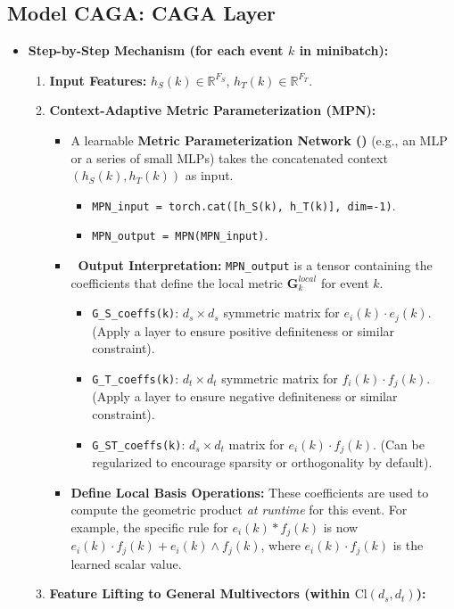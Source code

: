 \documentclass[11pt]{article}
\newcommand{\Cl}[2]{\text{Cl}(#1, #2)} %
\newcommand{\R}{\mathbb{R}}
\newcommand{\Fs}{F_S} %
\newcommand{\Ft}{F_T} %
\newcommand{\Hs}{h_S} %
\newcommand{\Ht}{h_T} %
\newcommand{\MPN}{\text{MPN}}
\newenvironment{modeldescription}[1]{%
    \subsection*{Model #1: \MakeUppercase{#1} Layer}%
    \begin{itemize}[leftmargin=*,noitemsep]%
}{%
    \end{itemize}%
}
\begin{document}
\begin{modeldescription}{CAGA}
    \item \textbf{Step-by-Step Mechanism (for each event $k$ in minibatch):}
    \begin{enumerate}[noitemsep]
        \item \textbf{Input Features:} $\Hs(k) \in \R^{\Fs}$, $\Ht(k) \in \R^{\Ft}$.
        \item \textbf{Context-Adaptive Metric Parameterization (MPN):}
        \begin{itemize}[noitemsep]
            \item A learnable \textbf{Metric Parameterization Network (\MPN)} (e.g., an MLP or a series of small MLPs) takes the concatenated context $(\Hs(k), \Ht(k))$ as input.
                \begin{itemize}[noitemsep]
                    \item \texttt{MPN\_input = torch.cat([\Hs(k), \Ht(k)], dim=-1)}.
                    \item \texttt{MPN\_output = MPN(MPN\_input)}.
                \end{itemize}
            \item \textbf{\MPN \ Output Interpretation:} \texttt{MPN\_output} is a tensor containing the coefficients that define the local metric $\mathbf{G}_k^{local}$ for event $k$.
                \begin{itemize}[noitemsep]
                    \item \texttt{G\_S\_coeffs(k)}: $d_s \times d_s$ symmetric matrix for $e_i(k) \cdot e_j(k)$. (Apply a layer to ensure positive definiteness or similar constraint).
                    \item \texttt{G\_T\_coeffs(k)}: $d_t \times d_t$ symmetric matrix for $f_i(k) \cdot f_j(k)$. (Apply a layer to ensure negative definiteness or similar constraint).
                    \item \texttt{G\_ST\_coeffs(k)}: $d_s \times d_t$ matrix for $e_i(k) \cdot f_j(k)$. (Can be regularized to encourage sparsity or orthogonality by default).
                \end{itemize}
            \item \textbf{Define Local Basis Operations:} These coefficients are used to compute the geometric product \textit{at runtime} for this event. For example, the specific rule for $e_i(k) * f_j(k)$ is now $e_i(k) \cdot f_j(k) + e_i(k) \wedge f_j(k)$, where $e_i(k) \cdot f_j(k)$ is the learned scalar value.
        \end{itemize}
        \item \textbf{Feature Lifting to General Multivectors (within $\Cl{d_s}{d_t}$):}

\end{enumerate}
\end{modeldescription}
\end{document}
